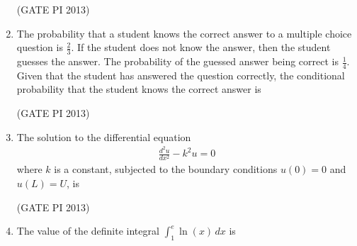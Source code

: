 \documentclass[journal,12pt,onecolumn]{IEEEtran}
\theoremstyle{remark}
\begin{document}
\begin{enumerate}
\hfill (GATE PI 2013)


\item The probability that a student knows the correct answer to a multiple choice question is $ \frac{2}{3} $. If the student does not know the answer, then the student guesses the answer. The probability of the guessed answer being correct is $ \frac{1}{4} $. Given that the student has answered the question correctly, the conditional probability that the student knows the correct answer is
\begin{enumerate}
\end{enumerate}

\hfill (GATE PI 2013)


\item The solution to the differential equation 
\begin{align*}
\frac{d^2 u}{dx^2} - k^2 u = 0
\end{align*}
where $k$ is a constant, subjected to the boundary conditions $u(0) = 0$ and $u(L) = U$, is
\begin{enumerate}
\end{enumerate}

\hfill (GATE PI 2013)

\newpage
\item The value of the definite integral 
$
\int_1^e \ln(x) \, dx
$
is
\begin{enumerate}
\end{enumerate}


\end{enumerate}
\end{document}
